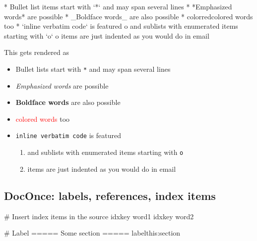 \documentclass[%
oneside,                 %
final,                   %
10pt]{article}
\begin{document}
\bccq
 * Bullet list items start with `*`
   and may span several lines
 * *Emphasized words* are possible
 * _Boldface words_ are also possible
 * color{red}{colored words} too
 * `inline verbatim code` is featured
   o and sublists with enumerated items starting with `o`
   o items are just indented as you would do in email

\eccq


This gets rendered as

\begin{itemize}
 \item Bullet lists start with \texttt{*} and may span several lines

 \item \emph{Emphasized words} are possible

 \item \textbf{Boldface words} are also possible

 \item \textcolor{red}{colored words} too

 \item \texttt{inline verbatim code} is featured
\begin{enumerate}

  \item and sublists with enumerated items starting with \texttt{o}

  \item items are just indented as you would do in email
\end{enumerate}

\noindent
\end{itemize}

\noindent
\subsection{DocOnce: labels, references, index items}






















\bdo
# Insert index items in the source
idx{key word1} idx{key word2}

# Label
===== Some section =====
label{this:section}
\end{document}
